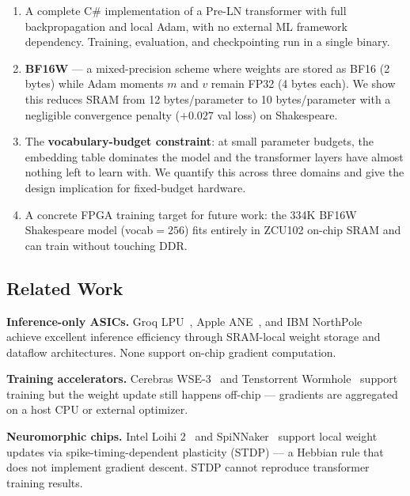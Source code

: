 \documentclass[11pt]{article}
\begin{document}
\begin{enumerate}
  \item A complete C\# implementation of a Pre-LN transformer with full backpropagation
    and local Adam, with no external ML framework dependency.
    Training, evaluation, and checkpointing run in a single binary.

  \item \textbf{BF16W} --- a mixed-precision scheme where weights are stored as BF16
    (2 bytes) while Adam moments $m$ and $v$ remain FP32 (4 bytes each). We show this
    reduces SRAM from 12 bytes/parameter to 10 bytes/parameter with a negligible
    convergence penalty ($+0.027$ val loss) on Shakespeare.

  \item The \textbf{vocabulary-budget constraint}: at small parameter budgets, the
    embedding table dominates the model and the transformer layers have almost nothing
    left to learn with. We quantify this across three domains and give the design
    implication for fixed-budget hardware.

  \item A concrete FPGA training target for future work: the 334K BF16W Shakespeare model
    (vocab$=256$) fits entirely in ZCU102 on-chip SRAM and can train without touching DDR.
\end{enumerate}

\subsection{Related Work}

\textbf{Inference-only ASICs.}
Groq LPU~\cite{groq}, Apple ANE~\cite{apple_ane}, and IBM NorthPole~\cite{ibm_northpole}
achieve excellent inference efficiency through SRAM-local weight storage and dataflow
architectures. None support on-chip gradient computation.

\textbf{Training accelerators.}
Cerebras WSE-3~\cite{cerebras} and Tenstorrent Wormhole~\cite{tenstorrent} support
training but the weight update still happens off-chip --- gradients are aggregated
on a host CPU or external optimizer.

\textbf{Neuromorphic chips.}
Intel Loihi 2~\cite{loihi2} and SpiNNaker~\cite{spinnaker} support local weight updates
via spike-timing-dependent plasticity (STDP) --- a Hebbian rule that does not implement
gradient descent. STDP cannot reproduce transformer training results.

\end{document}
